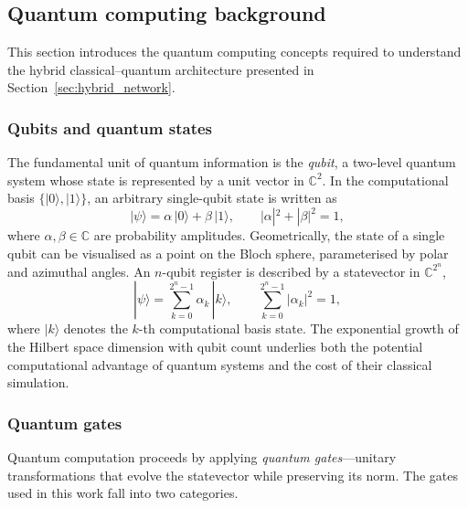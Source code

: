 
\subsection{Quantum computing background}
\label{sec:quantum_background}

This section introduces the quantum computing concepts required to
understand the hybrid classical--quantum architecture presented in
Section~\ref{sec:hybrid_network}.

\subsubsection{Qubits and quantum states}

The fundamental unit of quantum information is the \emph{qubit}, a
two-level quantum system whose state is represented by a unit vector in
$\mathbb{C}^2$.  In the computational basis $\{|0\rangle, |1\rangle\}$,
an arbitrary single-qubit state is written as
\begin{equation}
  |\psi\rangle = \alpha\,|0\rangle + \beta\,|1\rangle, \qquad
  |\alpha|^2 + |\beta|^2 = 1,
\end{equation}
where $\alpha, \beta \in \mathbb{C}$ are probability amplitudes.
Geometrically, the state of a single qubit can be visualised as a point
on the Bloch sphere, parameterised by polar and azimuthal angles.  An
$n$-qubit register is described by a statevector in
$\mathbb{C}^{2^n}$,
\begin{equation}
  |\psi\rangle = \sum_{k=0}^{2^n - 1} \alpha_k\,|k\rangle, \qquad
  \sum_{k=0}^{2^n - 1} |\alpha_k|^2 = 1,
\end{equation}
where $|k\rangle$ denotes the $k$-th computational basis state.  The
exponential growth of the Hilbert space dimension with qubit count
underlies both the potential computational advantage of quantum systems
and the cost of their classical simulation.

\subsubsection{Quantum gates}

Quantum computation proceeds by applying \emph{quantum gates}---unitary
transformations that evolve the statevector while preserving its norm.
The gates used in this work fall into two categories.

